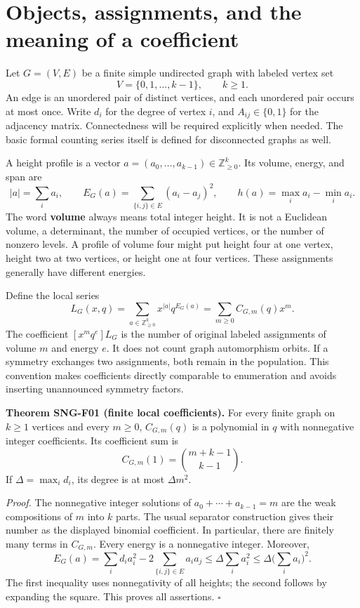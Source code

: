 \documentclass[
  11pt,
  a4paper,
]{report}
\begin{document}
\hypertarget{objects-assignments-and-the-meaning-of-a-coefficient}{%
\section{Objects, assignments, and the meaning of a
coefficient}\label{objects-assignments-and-the-meaning-of-a-coefficient}}

Let \(G=(V,E)\) be a finite simple undirected graph with labeled vertex
set \[
V=\{0,1,\ldots,k-1\},\qquad k\ge1.
\] An edge is an unordered pair of distinct vertices, and each unordered
pair occurs at most once. Write \(d_i\) for the degree of vertex \(i\),
and \(A_{ij}\in\{0,1\}\) for the adjacency matrix. Connectedness will be
required explicitly when needed. The basic formal counting series itself
is defined for disconnected graphs as well.

A height profile is a vector
\(a=(a_0,\ldots,a_{k-1})\in\mathbb Z_{\ge0}^k\). Its volume, energy, and
span are \[
|a|=\sum_i a_i,\qquad
E_G(a)=\sum_{\{i,j\}\in E}(a_i-a_j)^2,\qquad
h(a)=\max_i a_i-\min_i a_i.
\] The word \textbf{volume} always means total integer height. It is not
a Euclidean volume, a determinant, the number of occupied vertices, or
the number of nonzero levels. A profile of volume four might put height
four at one vertex, height two at two vertices, or height one at four
vertices. These assignments generally have different energies.

Define the local series \[
L_G(x,q)=\sum_{a\in\mathbb Z_{\ge0}^k}x^{|a|}q^{E_G(a)}
=\sum_{m\ge0}C_{G,m}(q)x^m.
\] The coefficient \([x^m q^e]L_G\) is the number of original labeled
assignments of volume \(m\) and energy \(e\). It does not count graph
automorphism orbits. If a symmetry exchanges two assignments, both
remain in the population. This convention makes coefficients directly
comparable to enumeration and avoids inserting unannounced symmetry
factors.

\textbf{Theorem SNG-F01 (finite local coefficients).} For every finite
graph on \(k\ge1\) vertices and every \(m\ge0\), \(C_{G,m}(q)\) is a
polynomial in \(q\) with nonnegative integer coefficients. Its
coefficient sum is \[
C_{G,m}(1)=\binom{m+k-1}{k-1}.
\] If \(\Delta=\max_i d_i\), its degree is at most \(\Delta m^2\).

\emph{Proof.} The nonnegative integer solutions of
\(a_0+\cdots+a_{k-1}=m\) are the weak compositions of \(m\) into \(k\)
parts. The usual separator construction gives their number as the
displayed binomial coefficient. In particular, there are finitely many
terms in \(C_{G,m}\). Every energy is a nonnegative integer. Moreover,
\[
E_G(a)=\sum_i d_i a_i^2-2\sum_{\{i,j\}\in E}a_i a_j
\le\Delta\sum_i a_i^2\le\Delta\bigl(\sum_i a_i\bigr)^2.
\] The first inequality uses nonnegativity of all heights; the second
follows by expanding the square. This proves all assertions. \(\square\)
\end{document}
